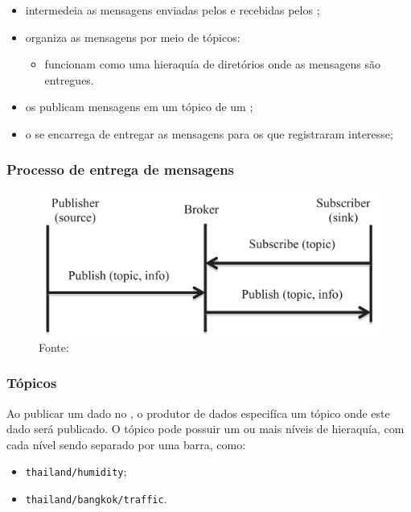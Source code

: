 \documentclass[aspectratio=169]{beamer}
\begin{document}
\begin{frame}
	\frametitle{\Broker}
	\begin{itemize}
		\item intermedeia as mensagens enviadas pelos \pubs e recebidas pelos \subs;

		\item organiza as mensagens por meio de tópicos:
			\begin{itemize}
				\item funcionam como uma hieraquía de diretórios onde as mensagens são entregues.
			\end{itemize}

		\item os \pubs publicam mensagens em um tópico de um \broker;

		\item o \broker se encarrega de entregar as mensagens para os \subs que registraram interesse;
	\end{itemize}
\end{frame}

\begin{frame}
	\frametitle{Processo de entrega de mensagens \mqtt}
	\begin{figure}
		\centering
		\includegraphics[width=.70\linewidth]{img/mqtt-sequence.png}
		\caption{Fonte:\cite{al-fuqaha:et-al:2015}}
	\end{figure}
\end{frame}

\begin{frame}
	\frametitle{Tópicos \mqtt}
	Ao publicar um dado no \broker \mqtt, o produtor de dados especifíca um tópico onde este dado será publicado.
	O tópico pode possuir um ou mais níveis de hieraquía, com cada nível sendo separado por uma barra, como:
	\begin{itemize}
		\item \texttt{thailand/humidity};
		\item \texttt{thailand/bangkok/traffic}.
	\end{itemize}
\end{frame}
\end{document}
